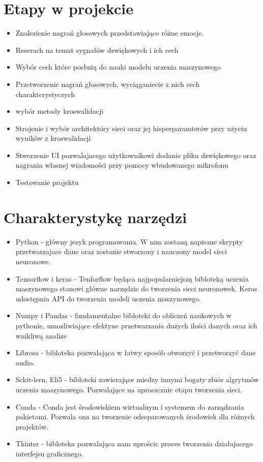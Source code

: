 \documentclass[12pt,titlepage]{article}
\begin{document}
\section{Etapy w projekcie}
\begin{itemize}
    \item Znalezienie nagrań głosowych przedstawiające różne emocje.
    \item Reserach na temat sygnałów dzwiękowych i ich cech
    \item Wybór cech które posłużą do nauki modelu uczenia maszynowego
    \item Przetworzenie nagrań głosowych, wyciąganiecie z nich cech charakterystyczych
    \item wybór metody kroswalidacji
    \item Strojenie i wybór architektóry sieci oraz jej hisperparamterów przy użyciu wyników z kroswalidacji
    \item Stworzenie UI pozwalajacego użytkownikowi dodanie pliku dzwiękowego oraz nagrania własnej wiadomości przy pomocy wbudowanego mikrofonu
    \item Testowanie projektu
\end{itemize}

\section{Charakterystykę narzędzi}
\begin{itemize}
    \item Python - główny jezyk programowania. W nim zostaną napisane skrypty przetwarzajace dane oraz zostanie stworzony i nauczony model sieci neuronowe.
    \item Tensorflow i keras - Tenforflow będąca najpopularniejszą bibloteką uczenia maszynowego stanowi główne narzędzie do tworzenia sieci neuronowek. Keras udostępnia API do tworzenia modeli uczenia maszynowego.
    \item Numpy i Pandas - fundamentalne bibloteki do obliczeń naukowych w pythonie, umozliwiające efektyne przetwarzania dużych ilości danych oraz ich wnikliwą analize
    \item Librosa - bibloteka pozwalająca w łatwy sposób otworzyć i przetworzyć dane audio.
    \item Sckit-lern, Eli5 - bibloteki zawierające miedzy innymi bogaty zbiór algrytmów uczenia maszynowego. Pozwalające na uproszcznie etapu tworzenia sieci.
    \item Conda - Conda jest środowiskiem wirtualnym i systemem do zarządzania pakietami. Pozwala ona na tworzenie odseparowanych środowisk dla różnych projektów.
    \item Tkinter - bibloteka pozwalająca nam uprościc proces tworzenia działajacego interfejsu graficznego.
\end{itemize}
\end{document}
